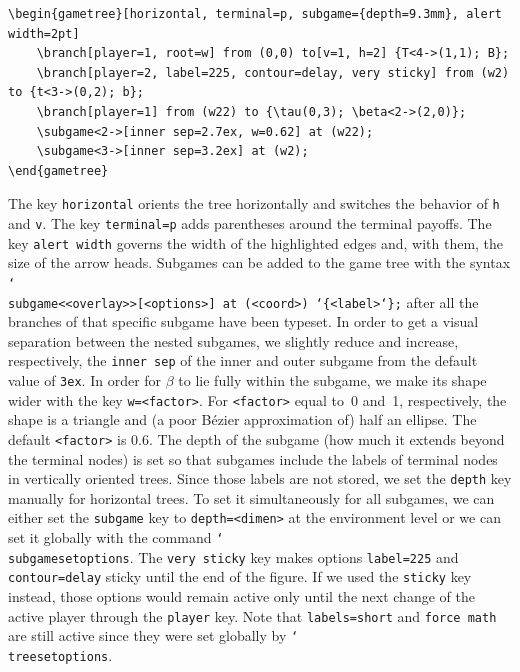 \documentclass{article}
\renewcommand{\textbackslash}{\char`\\}
\def\cmd#1{\texttt{\color{cmd}\textbackslash#1}}
\def\leftbrace{\char`\{}
\def\rightbrace{\char`\}}
\def\arg#1{{\color{cmd}\leftbrace}{\color{black}#1}{\color{cmd}\rightbrace}}
\def\optarg[#1]{{\color{player1}[#1]}}
\def\largeskip{\vskip9pt plus 3pt minus 3pt}
\begin{document}
\begin{verbatim}
\begin{gametree}[horizontal, terminal=p, subgame={depth=9.3mm}, alert width=2pt]
	\branch[player=1, root=w] from (0,0) to[v=1, h=2] {T<4->(1,1); B};
	\branch[player=2, label=225, contour=delay, very sticky] from (w2) to {t<3->(0,2); b};
	\branch[player=1] from (w22) to {\tau(0,3); \beta<2->(2,0)};
	\subgame<2->[inner sep=2.7ex, w=0.62] at (w22);
	\subgame<3->[inner sep=3.2ex] at (w2);
\end{gametree}
\end{verbatim}
\vspace{-1mm}

The key \texttt{horizontal} orients the tree horizontally and switches the behavior of \texttt{h} and \texttt{v}. The key \texttt{terminal=p} adds parentheses around the terminal payoffs. The key \texttt{alert width} governs the width of the highlighted edges and, with them, the size of the arrow heads. Subgames can be added to the game tree with the syntax \cmd{subgame}\texttt{<<overlay>>\optarg[<options>] at (<coord>) \arg{<label>};} after all the branches of that specific subgame have been typeset. In order to get a visual separation between the nested subgames, we slightly reduce and increase, respectively, the \texttt{inner sep} of the inner and outer subgame from the default value of \texttt{3ex}. In order for $\beta$ to lie fully within the subgame, we make its shape wider with the key \texttt{w=<factor>}. For \texttt{<factor>} equal to~0 and~1, respectively, the shape is a triangle and (a poor B\'ezier approximation of) half an ellipse. The default \texttt{<factor>} is 0.6. The depth of the subgame (how much it extends beyond the terminal nodes) is set so that subgames include the labels of terminal nodes in vertically oriented trees. Since those labels are not stored, we set the \texttt{depth} key manually for horizontal trees. To set it simultaneously for all subgames, we can either set the \texttt{subgame} key to \texttt{depth=<dimen>} at the environment level or we can set it globally with the command \cmd{subgamesetoptions}.
%
The \texttt{very sticky} key makes options \texttt{label=225} and \texttt{contour=delay} sticky until the end of the figure. If we used the \texttt{sticky} key instead, those options would remain active only until the next change of the active player through the \texttt{player} key. Note that \texttt{labels=short} and \texttt{force math} are still active since they were set globally by \cmd{treesetoptions}.\largeskip
\end{document}
